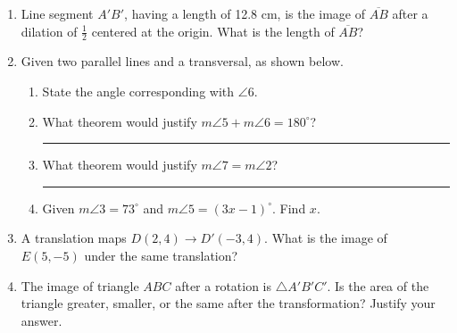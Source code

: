 \documentclass[12pt, twoside]{article}
\begin{document}
\begin{enumerate}
  
\newpage

  \item Line segment $A'B'$, having a length of 12.8 cm, is the image of $\overline{AB}$ after a dilation of $\displaystyle \frac{1}{2}$ centered at the origin. What is the length of $\overline{AB}$? \vspace{4cm}
  

  \item Given two parallel lines and a transversal, as shown below.
  \begin{center}
  \end{center}
  \begin{enumerate}
    \item State the angle corresponding with $\angle 6$. \vspace{0.5cm}
    \item What theorem would justify $m\angle 5 + m\angle 6 =180^\circ$? \rule{6cm}{0.15mm} \vspace{0.5cm}
    \item What theorem would justify $m\angle 7 = m\angle 2$? \rule{7cm}{0.15mm} \vspace{0.5cm}
    \item Given $m\angle 3 = 73^\circ$ and $m\angle 5 = (3x-1)^\circ$. Find $x$. \vspace{5cm}
  \end{enumerate}

\newpage
  \item A translation maps $D(2,4) \rightarrow D'(-3,4)$. What is the image of $E(5,-5)$ under the same translation?  \vspace{3.5cm}

  \item The image of triangle $ABC$ after a rotation is $\triangle A'B'C'$. Is the area of the triangle greater, smaller, or the same after the transformation? Justify your answer. \vspace{3.5cm}


\end{enumerate}
\end{document}
